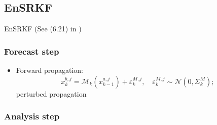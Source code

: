 \documentclass{article}
\begin{document}
\subsection{EnSRKF}
EnSRKF (See (6.21) in \cite{Bocquet2016})

\subsubsection{Forecast step}
\begin{itemize}
	\item Forward propagation:
	      $$
		      x_k^{b,j}=\mathcal{M}_k(x_{k-1}^{a,j})+\varepsilon_k^{M,j},\quad \varepsilon_k^{M,j}\sim\mathcal{N}(0,\Sigma_k^M);
	      $$
	      perturbed propagation
\end{itemize}

\subsubsection{Analysis step}
\end{document}
